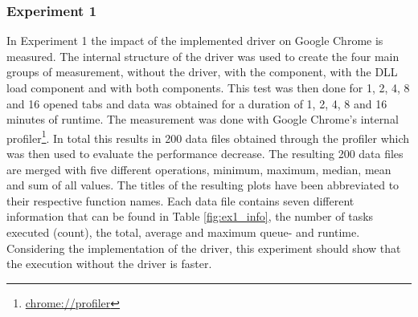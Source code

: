 \subsubsection{Experiment 1}
In Experiment 1 the impact of the implemented driver on Google Chrome is measured. The internal structure of the driver was used to create the four main groups of measurement, without the driver, with the  component, with the DLL load component and with both components. This test was then done for 1, 2, 4, 8 and 16 opened tabs and data was obtained for a duration of 1, 2, 4, 8 and 16 minutes of runtime. The measurement was done with Google Chrome's internal profiler\footnote{\url{chrome://profiler}}. In total this results in 200 data files obtained through the profiler which was then used to evaluate the performance decrease. The resulting 200 data files are merged with five different operations, minimum, maximum, median, mean and sum of all values. The titles of the resulting plots have been abbreviated to their respective function names. Each data file contains seven different information that can be found in Table \ref{fig:ex1_info}, the number of tasks executed (count), the total, average and maximum queue- and runtime. Considering the implementation of the driver, this experiment should show that the execution without the driver is faster.

